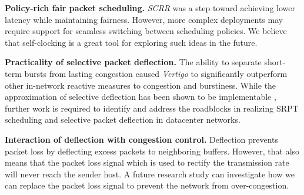 \textbf{Policy-rich fair packet scheduling.}
\textit{SCRR} was a step toward achieving lower latency while maintaining fairness. However, more complex deployments may require support for seamless switching between scheduling policies. We believe that self-clocking is a great tool for exploring such ideas in the future.

\textbf{Practicality of selective packet deflection.}
The ability to separate short-term bursts from lasting congestion caused \textit{Vertigo} to significantly outperform other in-network reactive measures to congestion and burstiness. While the approximation of selective  deflection has been shown to be implementable \cite{practical-deflection}, further work is required to identify and address the roadblocks in realizing SRPT scheduling and selective packet deflection in datacenter networks.

\textbf{Interaction of deflection with congestion control.}
Deflection prevents packet loss by deflecting excess packets to neighboring buffers. However, that also means that the packet loss signal which is used to rectify the transmission rate will never reach the sender host. A future research study can investigate how we can replace the packet loss signal to prevent the network from over-congestion.